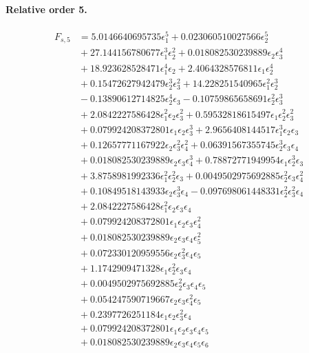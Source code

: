 \documentclass[10pt]{article}
\begin{document}
\paragraph{Relative order 5.}
\begin{align*}
F_{s,5} &= 5.0146640695735 \epsilon_{1}^{5} + 0.023060510027566 \epsilon_{2}^{5} \\
&{}  + 27.144156780677 \epsilon_{1}^{3} \epsilon_{2}^{2} + 0.018082530239889 \epsilon_{2} \epsilon_{3}^{4} \\
&{}  + 18.923628528471 \epsilon_{1}^{4} \epsilon_{2} + 2.4064328576811 \epsilon_{1} \epsilon_{2}^{4} \\
&{}  + 0.15472627942479 \epsilon_{2}^{3} \epsilon_{3}^{2} + 14.228251540965 \epsilon_{1}^{2} \epsilon_{2}^{3} \\
&{}  - 0.13890612714825 \epsilon_{2}^{4} \epsilon_{3} - 0.10759865658691 \epsilon_{2}^{2} \epsilon_{3}^{3} \\
&{}  + 2.0842227586428 \epsilon_{1}^{2} \epsilon_{2} \epsilon_{3}^{2} + 0.59532818615497 \epsilon_{1} \epsilon_{2}^{2} \epsilon_{3}^{2} \\
&{}  + 0.079924208372801 \epsilon_{1} \epsilon_{2} \epsilon_{3}^{3} + 2.9656408144517 \epsilon_{1}^{3} \epsilon_{2} \epsilon_{3} \\
&{}  + 0.12657771167922 \epsilon_{2} \epsilon_{3}^{2} \epsilon_{4}^{2} + 0.06391567355745 \epsilon_{2}^{3} \epsilon_{3} \epsilon_{4} \\
&{}  + 0.018082530239889 \epsilon_{2} \epsilon_{3} \epsilon_{4}^{3} + 0.78872771949954 \epsilon_{1} \epsilon_{2}^{3} \epsilon_{3} \\
&{}  + 3.8758981992336 \epsilon_{1}^{2} \epsilon_{2}^{2} \epsilon_{3} + 0.0049502975692885 \epsilon_{2}^{2} \epsilon_{3} \epsilon_{4}^{2} \\
&{}  + 0.10849518143933 \epsilon_{2} \epsilon_{3}^{3} \epsilon_{4} - 0.097698061448331 \epsilon_{2}^{2} \epsilon_{3}^{2} \epsilon_{4} \\
&{}  + 2.0842227586428 \epsilon_{1}^{2} \epsilon_{2} \epsilon_{3} \epsilon_{4} \\
&{}  + 0.079924208372801 \epsilon_{1} \epsilon_{2} \epsilon_{3} \epsilon_{4}^{2} \\
&{}  + 0.018082530239889 \epsilon_{2} \epsilon_{3} \epsilon_{4} \epsilon_{5}^{2} \\
&{}  + 0.072330120959556 \epsilon_{2} \epsilon_{3}^{2} \epsilon_{4} \epsilon_{5} \\
&{}  + 1.1742909471328 \epsilon_{1} \epsilon_{2}^{2} \epsilon_{3} \epsilon_{4} \\
&{}  + 0.0049502975692885 \epsilon_{2}^{2} \epsilon_{3} \epsilon_{4} \epsilon_{5} \\
&{}  + 0.054247590719667 \epsilon_{2} \epsilon_{3} \epsilon_{4}^{2} \epsilon_{5} \\
&{}  + 0.2397726251184 \epsilon_{1} \epsilon_{2} \epsilon_{3}^{2} \epsilon_{4} \\
&{}  + 0.079924208372801 \epsilon_{1} \epsilon_{2} \epsilon_{3} \epsilon_{4} \epsilon_{5} \\
&{}  + 0.018082530239889 \epsilon_{2} \epsilon_{3} \epsilon_{4} \epsilon_{5} \epsilon_{6}
\end{align*}
\end{document}
